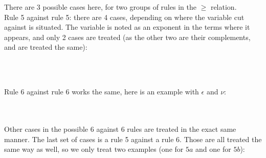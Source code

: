 \begin{myproof}
There are 3 possible cases here, for two groups of rules in the $\geq$ relation.\\
Rule 5 against rule 5: there are 4 cases, depending on where the variable cut against is situated. The variable is noted as an exponent in the terms where it appears, and only 2 cases are treated (as the other two are their complements, and are treated the same):\\
\\
\\
Rule 6 against rule 6 works the same, here is an example with $\epsilon$ and $\nu$:\\
\\~\\
Other cases in the possible 6 against 6 rules are treated in the exact same manner. The last set of cases is a rule 5 against a rule 6. Those are all treated the same way as well, so we only treat two examples (one for $5a$ and one for $5b$):\\
\end{myproof}
